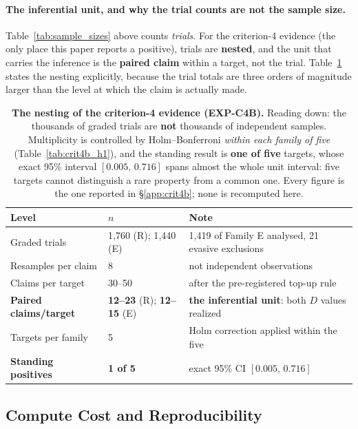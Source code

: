 \paragraph{The inferential unit, and why the trial counts are not the sample size.} Table~\ref{tab:sample_sizes} above counts \emph{trials}. For the criterion-4 evidence (the only place this paper reports a positive), trials are \textbf{nested}, and the unit that carries the inference is the \textbf{paired claim} within a target, not the trial. Table~\ref{tab:inference_ladder} states the nesting explicitly, because the trial totals are three orders of magnitude larger than the level at which the claim is actually made.

\begin{table}[h]
\centering
\caption{\textbf{The nesting of the criterion-4 evidence (EXP-C4B).} Reading down: the thousands of graded trials are \textbf{not} thousands of independent samples. Multiplicity is controlled by Holm--Bonferroni \emph{within each family of five} (Table~\ref{tab:crit4b_h1}), and the standing result is \textbf{one of five} targets, whose exact 95\% interval $[0.005,\,0.716]$ spans almost the whole unit interval: five targets cannot distinguish a rare property from a common one. Every figure is the one reported in §\ref{app:crit4b}; none is recomputed here.}
\label{tab:inference_ladder}
\begin{small}
\begin{tabular}{@{}llp{2.05in}@{}}
\toprule
\textbf{Level} & \textbf{$n$} & \textbf{Note} \\
\midrule
Graded trials & 1{,}760 (R); 1{,}440 (E) & 1{,}419 of Family E analysed, 21 evasive exclusions \\
Resamples per claim & 8 & not independent observations \\
Claims per target & 30--50 & after the pre-registered top-up rule \\
\textbf{Paired claims/target} & \textbf{12--23} (R); \textbf{12--15} (E) & \textbf{the inferential unit}: both $D$ values realized \\
Targets per family & 5 & Holm correction applied within the five \\
\textbf{Standing positives} & \textbf{1 of 5} & exact 95\% CI $[0.005,\,0.716]$ \\
\bottomrule
\end{tabular}
\end{small}
\end{table}

\subsection{Compute Cost and Reproducibility}
\label{app:compute_cost}

